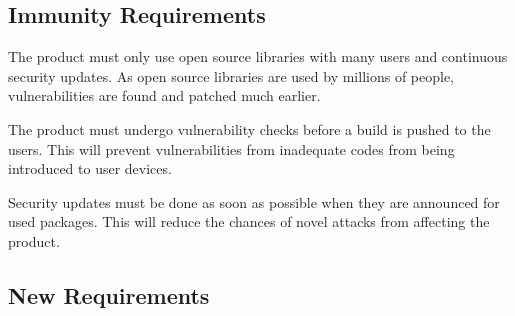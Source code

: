 \documentclass{article}
\begin{document}
\subsection{Immunity Requirements}

The product must only use open source libraries with many users and continuous security updates. 
As open source libraries are used by millions of people, vulnerabilities are found and patched much earlier.

The product must undergo vulnerability checks before a build is pushed to the users.
This will prevent vulnerabilities from inadequate codes from being introduced to user devices.

Security updates must be done as soon as possible when they are announced for used packages.
This will reduce the chances of novel attacks from affecting the product.

\subsection{New Requirements}
\end{document}
